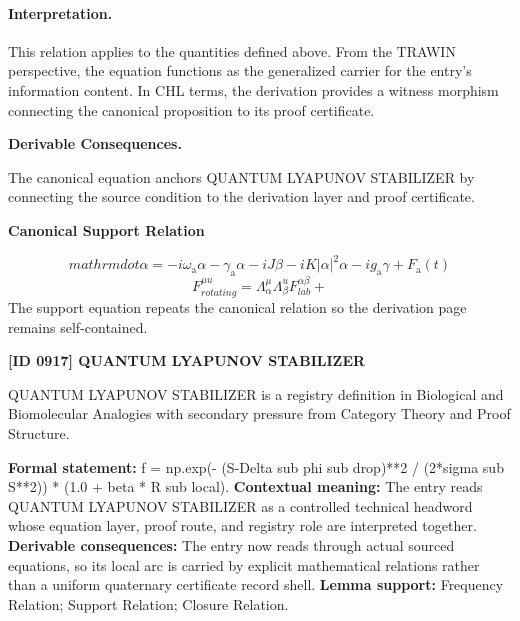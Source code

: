 \paragraph{Interpretation.}
This relation applies to the quantities defined above. From the TRAWIN perspective, the equation functions as the generalized carrier for the entry’s information content. In CHL terms, the derivation provides a witness morphism connecting the canonical proposition to its proof certificate.

\par\vspace{0.35em}
\noindent\textbf{Derivable Consequences.}\quad
\begingroup
\footnotesize
\raggedright
The canonical equation anchors QUANTUM LYAPUNOV STABILIZER by connecting the source condition to the derivation layer and proof certificate.
\par\endgroup

\noindent\textbf{Canonical Support Relation}\par
\[
mathrm{dot}{\alpha} = -i\omega_{\mathrm{a}} \alpha - \gamma_{\mathrm{a}} \alpha - iJ\beta - iK|\alpha|^2\alpha - i g_{\mathrm{a}} \gamma + F_{\mathrm{a}}(t)
\]
\[
F_{rotating}^{\mu u}=\Lambda_{\alpha}^{\mu}\Lambda_{\beta}^{ u}F_{lab}^{\alpha\beta}+
\]
\noindent The support equation repeats the canonical relation so the derivation page remains self-contained.\par

\clearpage
\noindent\textbf{[ID 0917] QUANTUM LYAPUNOV STABILIZER}\par
\vspace{0.35em}
\begingroup\small
{}
QUANTUM LYAPUNOV STABILIZER is a registry definition in Biological and Biomolecular Analogies with secondary pressure from Category Theory and Proof Structure.

\begingroup\footnotesize\setlength{\emergencystretch}{3em}\sloppy
\textbf{Formal statement:} f = np.exp(- (S-Delta sub phi sub drop)**2 / (2*sigma sub S**2)) * (1.0 + beta * R sub local). \textbf{Contextual meaning:} The entry reads QUANTUM LYAPUNOV STABILIZER as a controlled technical headword whose equation layer, proof route, and registry role are interpreted together. \textbf{Derivable consequences:} The entry now reads through actual sourced equations, so its local arc is carried by explicit mathematical relations rather than a uniform quaternary certificate record shell. \textbf{Lemma support:} Frequency Relation; Support Relation; Closure Relation.\par
\endgroup

